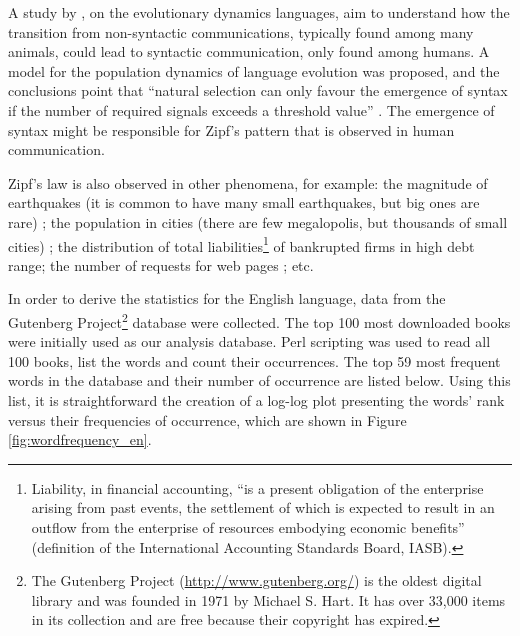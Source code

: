 A study by \cite{nowak2000}, on the evolutionary dynamics languages, aim to understand how the transition from 
non-syntactic communications, typically found among many animals, could lead to syntactic communication,
only found among humans. A model for the population dynamics of language evolution was proposed,
and the conclusions point that ``natural selection can only favour the emergence of syntax
if the number of required signals exceeds a threshold value'' \citep{nowak2000}. The emergence of syntax might be
responsible for Zipf's pattern that is observed in human communication.

Zipf's law is also observed in other phenomena, for example: the magnitude of earthquakes 
(it is common to have many small earthquakes, but big ones are rare) \citep{suzuki2005}; 
the population in cities (there are few megalopolis, but thousands of small cities) \citep{gabaix1999}; 
the distribution of total liabilities\footnote{Liability, in financial accounting, 
``is a present obligation of the enterprise arising from past events, the settlement of which 
is expected to result in an outflow from the enterprise of resources embodying economic benefits'' 
(definition of the International Accounting Standards Board, IASB).} of bankrupted firms in high 
debt range\citep{fujiwara2004}; the number of requests for web pages \citep{huberman2002}; etc.

In order to derive the statistics for the English language, data from the Gutenberg Project\footnote{The Gutenberg Project (\url{http://www.gutenberg.org/}) is the oldest digital library and was founded in 1971 by Michael S. Hart. It has over 33,000 items in its collection and are free because their copyright has expired.} database were collected. The top 100 most downloaded books were initially used as our analysis database. Perl scripting was used to read all 100 books, list the words and count their occurrences. The top 59 most frequent words in the database and their number of occurrence are listed below. Using this list, it is straightforward the creation of a log-log plot presenting the words' rank versus their frequencies of occurrence, which are shown in Figure \ref{fig:wordfrequency_en}.

